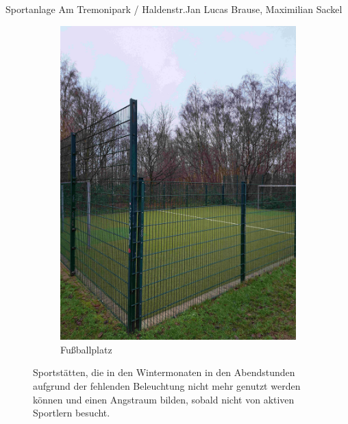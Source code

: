 \documentclass{../../templates/amendment}
\begin{document}
\begin{boxed}{Sportanlage Am Tremonipark / Haldenstr.}{Jan Lucas Brause, Maximilian Sackel}
\begin{figure}[htpb]
\begin{subfigure}[t]{0.32\textwidth}
\begin{center}
                \includegraphics[width=\linewidth]{pictures/photo4.jpg}
                \caption{Fußballplatz}%
            \end{center}
        \end{subfigure}
        \caption{Sportstätten, die in den Wintermonaten in den Abendstunden aufgrund der fehlenden Beleuchtung nicht mehr genutzt werden können und einen Angstraum bilden, sobald nicht von aktiven Sportlern besucht.}
    \end{figure}


\end{boxed}
\end{document}
